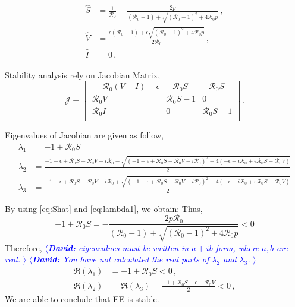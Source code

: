 \documentclass[12pt]{article}
\newcommand{\R}{\mathcal{R}}
\newcommand{\david}[1]{\textcolor{blue}{$\langle${\slshape{\bfseries David:} #1 }$\rangle$}}
\begin{document}
\begin{subequations}
\begin{align}
\hat{S}&= \frac{1}{\R_0}-\frac{2p}{(\R_0 -1)+ \sqrt{(\R_0-1)^2+4\R_0
         p}}\,, \label{eq:Shat}\\
\hat{V}&= \frac{\epsilon(\R_0 -1)+ \epsilon \sqrt{(\R_0-1)^2+4\R_0 p}}{2\R_0}\,, \label{eq:Vhat}\\
\hat{I}&=0\,, \label{eq:Ihat}
\end{align}
\end{subequations}

Stability analysis rely on Jacobian Matrix,
\begin{equation}
\mathcal{J} =
\begin{bmatrix}
    \ -\R_0 (V+I)-\epsilon       & -\R_0 S     &-\R_0 S\\
    \ \R_0 V       & \R_0 S-1    &0\\
    \ \R_0 I       &0     &\R_0 S-1\\
\end{bmatrix}\,.
\end{equation}

Eigenvalues of Jacobian are given as follow,
\begin{subequations}
\begin{align}
\lambda_1&=-1+\R_0 S \label{eq:lambda1}\\
\lambda_2&=\frac{-1-\epsilon+\R_0 S-\R_0 V-i\R_0-\sqrt{(-1-\epsilon+\R_0 S-\R_0 V-i\R_0)^2+4(-\epsilon-i\R_0+\epsilon\R_0 S-\R_0 V)}}{2}\\
\lambda_3&=\frac{-1-\epsilon+\R_0 S-\R_0 V-i\R_0+\sqrt{(-1-\epsilon+\R_0 S-\R_0 V-i\R_0)^2+4(-\epsilon-i\R_0+\epsilon\R_0 S-\R_0 V)}}{2}
\end{align}
\end{subequations}

By using \autoref{eq:Shat} and \autoref{eq:lambda1}, we obtain:
Thus,
\begin{equation}
-1+\R_0 S = - \frac{2p\R_0}{(\R_0 -1)+ \sqrt{(\R_0-1)^2+4\R_0 p}}<0
\end{equation}
Therefore, \david{eigenvalues must be written in $a+ib$ form, where
  $a,b$ are real.}
\david{You have not calculated the real parts of $\lambda_2$ and $\lambda_3$.}
\begin{subequations}
\begin{align}
\Re(\lambda_1) &=-1+\R_0 S<0\,,\\
\Re(\lambda_2) &=\Re(\lambda_3)=\frac{-1+\R_0 S-\epsilon-\R_0 V}{2}<0\,,
\end{align}
\end{subequations}
We are able to conclude that EE is stable.
\end{document}
